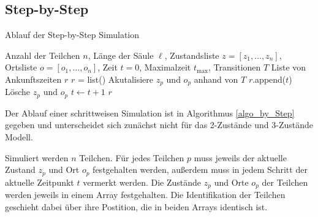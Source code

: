 
\subsection{Step-by-Step}


\begin{algorithm}
\caption{Ablauf der Step-by-Step Simulation}
\label{algo_by_Step}
\begin{algorithmic}[1]
\REQUIRE Anzahl der Teilchen $n$, Länge der Säule $\ell$, Zustandsliste $z= [z_1 , \ldots, z_n]$, Ortsliste $o=[o_1, \ldots , o_n]$, Zeit $t=0$, Maximalzeit $t_{\text{max}}$, Transitionen $T$
\ENSURE Liste von Ankunftszeiten $r$
\STATE $r$ = list()
\STATE Akutalisiere $z_p$ und $o_p$ anhand von $T$
\STATE $r$.append($t$)
\STATE Lösche $z_p$ und $o_p$
\ENDIF
\ENDFOR
\STATE $t \leftarrow t+1$%
\ENDWHILE
\RETURN $r$
\end{algorithmic}
\end{algorithm}

Der Ablauf einer schrittweisen Simulation ist in Algorithmus \ref{algo_by_Step} gegeben und unterscheidet sich zunächst nicht für das 2-Zustände und 3-Zustände Modell.

Simuliert werden $n$ Teilchen. Für jedes Teilchen $p$ muss jeweils der aktuelle Zustand $z_p$ und Ort $o_p$ festgehalten werden, außerdem muss in jedem Schritt der aktuelle Zeitpunkt $t$ vermerkt werden. Die Zustände $z_p$ und Orte $o_p$ der Teilchen  %
werden jeweils in einem Array festgehalten. Die Identifikation der Teilchen geschieht dabei über ihre Postition, die in beiden Arrays identisch ist.

